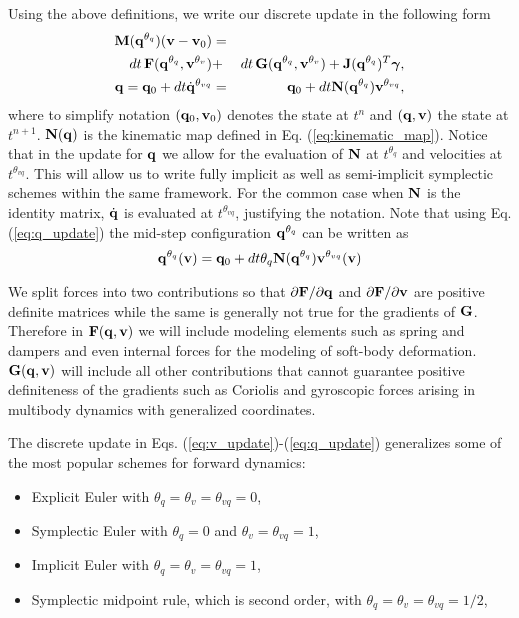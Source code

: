 Using the above definitions, we write our discrete update in the following form
\begin{eqnarray}
	\mf{M}(\mf{q}^{\theta_{q}})(\mf{v}-\mf{v}_0)  &=& \nonumber\\
	dt\,\mf{F}(\mf{q}^{\theta_{q}}, \mf{v}^{\theta_v}) &+&
	dt\,\mf{G}(\mf{q}^{\theta_{q}}, \mf{v}^{\theta_v}) +
	\mf{J}(\mf{q}^{\theta_{q}})^T\mf{\bgamma}, \label{eq:v_update}\\
	\mf{q} = \mf{q}_0 + dt \dot{\mf{q}}^{\theta_{vq}} &=& \mf{q}_0 + dt\mf{N}(\mf{q}^{\theta_{q}})\mf{v}^{\theta_{vq}},
	\label{eq:q_update}
\end{eqnarray}
where to simplify notation $({\mathbf{q}}_0, {\mathbf{v}}_0)$ denotes the state at $t^n$ and
$({\mathbf{q}}, {\mathbf{v}})$ the state at $t^{n+1}$. ${\mathbf{N}}({\mathbf{q}})$ is the kinematic map
defined in Eq. (\ref{eq:kinematic_map}). Notice that in the update for ${\mathbf{q}}$
we allow for the evaluation of ${\mathbf{N}}$ at $t^{\theta_{q}}$ and velocities
at $t^{\theta_{vq}}$. This will allow us to write fully implicit as well as
semi-implicit symplectic schemes within the same framework. For the common case
when ${\mathbf{N}}$ is the identity matrix, $\dot{{\mathbf{q}}}$ is evaluated at
$t^{\theta_{vq}}$, justifying the notation. Note that using Eq.
(\ref{eq:q_update}) the mid-step configuration ${\mathbf{q}}^{\theta_q}$ can be
written as
\begin{equation}
	\mf{q}^{\theta_q}(\mf{v}) = \mf{q}_0 + dt\theta_q\mf{N}(\mf{q}^{\theta_{q}})\mf{v}^{\theta_{vq}}(\mf{v})
	\label{eq:position_update}
\end{equation}


We split forces into two contributions so that $\partial {\mathbf{F}}/\partial{\mathbf{q}}$ and $\partial {\mathbf{F}}/\partial{\mathbf{v}}$ are positive definite matrices while the same is generally not true for the gradients of ${\mathbf{G}}$. Therefore in ${\mathbf{F}}({\mathbf{q}}, {\mathbf{v}})$ we will include modeling elements such as spring and dampers and even internal forces
for the modeling of soft-body deformation. ${\mathbf{G}}({\mathbf{q}}, {\mathbf{v}})$ will include
all other contributions that cannot guarantee positive definiteness of the
gradients such as Coriolis and gyroscopic forces arising in multibody dynamics with generalized coordinates.

The discrete update in Eqs. (\ref{eq:v_update})-(\ref{eq:q_update}) generalizes
some of the most popular schemes for forward dynamics:
\begin{itemize}
	\item Explicit Euler with $\theta_q=\theta_{v}=\theta_{vq} = 0$,
	\item Symplectic Euler with $\theta_{q} = 0$ and $\theta_v = \theta_{vq}=1$,
	\item Implicit Euler with $\theta_{q} = \theta_v = \theta_{vq}= 1$,
	\item Symplectic midpoint rule, which is second order, with $\theta_{q} =
	\theta_v = \theta_{vq}= 1/2$,
\end{itemize}

